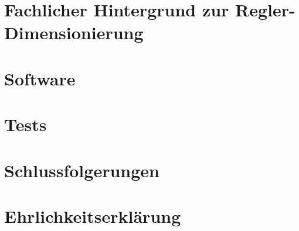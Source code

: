 \documentclass{fhnwreport/fhnwreport}
\begin{document}
\clearpage
\section{Fachlicher Hintergrund zur Regler-Dimensionierung}
\label{sec:fachlicher_hintergrund}



\clearpage
\section{Software}
\label{sec:software}



\clearpage
\section{Tests}
\label{sec:test}



\clearpage
\section{Schlussfolgerungen}
\label{sec:schlussfolgerungen}



\clearpage
\section*{Ehrlichkeitserkl\"arung}
\label{sec:ehrlickeitserklaerung}



\clearpage
\appendix
{}





\clearpage
{}
{}
{}
\end{document}
